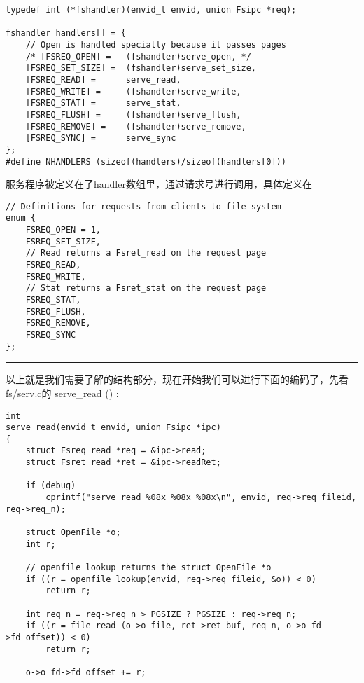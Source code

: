 \documentclass{article}
\newcommand{\funcname}[1]{{\ttfamily \small #1}}
\begin{document}
\begin{CJK*}{UTF8}{gkai}
\begin{lstlisting}[style=ccode, title={\scriptsize \ttfamily \bfseries fs/serv.c}]
typedef int (*fshandler)(envid_t envid, union Fsipc *req);

fshandler handlers[] = {
	// Open is handled specially because it passes pages
	/* [FSREQ_OPEN] =	(fshandler)serve_open, */
	[FSREQ_SET_SIZE] =	(fshandler)serve_set_size,
	[FSREQ_READ] =		serve_read,
	[FSREQ_WRITE] =		(fshandler)serve_write,
	[FSREQ_STAT] =		serve_stat,
	[FSREQ_FLUSH] =		(fshandler)serve_flush,
	[FSREQ_REMOVE] =	(fshandler)serve_remove,
	[FSREQ_SYNC] =		serve_sync
};
#define NHANDLERS (sizeof(handlers)/sizeof(handlers[0]))
\end{lstlisting}

服务程序被定义在了handler数组里，通过请求号进行调用，具体定义在

\begin{lstlisting}[style=ccode, firstnumber=74, title={\scriptsize \ttfamily \bfseries inc/lib.h}]
// Definitions for requests from clients to file system
enum {
	FSREQ_OPEN = 1,
	FSREQ_SET_SIZE,
	// Read returns a Fsret_read on the request page
	FSREQ_READ,
	FSREQ_WRITE,
	// Stat returns a Fsret_stat on the request page
	FSREQ_STAT,
	FSREQ_FLUSH,
	FSREQ_REMOVE,
	FSREQ_SYNC
};
\end{lstlisting}

\vspace{2em}
\hrule
\vspace{2em}

以上就是我们需要了解的结构部分，现在开始我们可以进行下面的编码了，先看fs/serv.c的 \funcname{serve\_read ()} :


\begin{lstlisting}[style=ccode, title={\scriptsize \ttfamily \bfseries fs/serv.c: serve\_read()}]
int
serve_read(envid_t envid, union Fsipc *ipc)
{
    struct Fsreq_read *req = &ipc->read;
    struct Fsret_read *ret = &ipc->readRet;

    if (debug)
        cprintf("serve_read %08x %08x %08x\n", envid, req->req_fileid, req->req_n);

    struct OpenFile *o;
    int r;

    // openfile_lookup returns the struct OpenFile *o 
    if ((r = openfile_lookup(envid, req->req_fileid, &o)) < 0)
		return r;

    int req_n = req->req_n > PGSIZE ? PGSIZE : req->req_n;
    if ((r = file_read (o->o_file, ret->ret_buf, req_n, o->o_fd->fd_offset)) < 0)
        return r;

    o->o_fd->fd_offset += r;


\end{lstlisting}
\end{CJK*}
\end{document}
